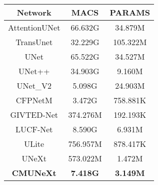 \begin{tabular}{c|c|c}
    \toprule[1.1pt]
    Network & MACS & PARAMS \\
    
    \midrule[1.1pt]

    AttentionUNet \cite{oktay2018attention}
    & 66.632G & 34.879M 	%
    \\
    
    TransUnet \cite{chen2021transunet}
    & 32.229G & 105.322M 	%
    \\
    
    UNet \cite{ronneberger2015u}
    & 65.522G & 34.527M 	%
    \\
    
    UNet++ \cite{zhou2018unet++}
    & 34.903G & 9.160M 	%
    \\
    
    UNet\_V2 \cite{peng2023u}
    & 5.098G & 24.903M 	%
    \\
    
    \midrule[0.7pt]
    
    CFPNetM \cite{lou2023cfpnet}
    & 3.472G & 758.881K 	%
    \\
    
    
    GIVTED-Net \cite{al2024givted}
    & 374.276M & 192.193K 	%
    \\
    
    LUCF-Net \cite{she2024lucf}
    & 8.590G & 6.931M 	%
    \\
    
    ULite \cite{dinh20231m}
    & 756.957M & 878.417K 	%
    \\
    
    UNeXt \cite{chang2024unext}
    & 573.022M & 1.472M 	%
    \\
    
    \midrule[0.7pt]
    
    \textbf{CMUNeXt} \cite{tang2024cmunext}
    & \textbf{7.418G} & \textbf{3.149M} 	%
    \\
    
    \bottomrule[1.1pt]
\end{tabular}